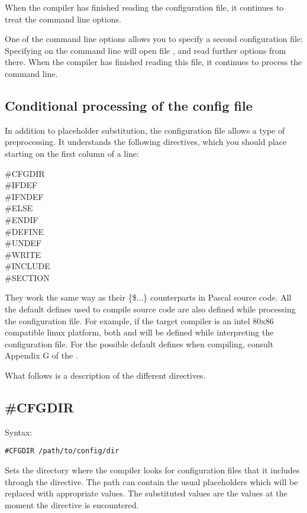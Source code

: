 When the compiler has finished reading the configuration file, it continues
to treat the command line options.

One of the command line options allows you to specify a second configuration
file: Specifying  on the command line will open file ,
and read further options from there. When the compiler has finished reading
this file, it continues to process the command line.

\subsection{Conditional processing of the config file}
In addition to placeholder substitution, the configuration file allows a type of preprocessing.
It understands the following directives, which you should place starting on the first column of a line:
\begin{description}
\item [\#CFGDIR]
\item [\#IFDEF]
\item [\#IFNDEF]
\item [\#ELSE]
\item [\#ENDIF]
\item [\#DEFINE]
\item [\#UNDEF]
\item [\#WRITE]
\item [\#INCLUDE]
\item [\#SECTION]
\end{description}
They work the same way as their \{\$...\}  counterparts in Pascal source code.
All the default defines used to compile source code are also defined while
processing the configuration file. For example, if the target compiler is an
intel 80x86 compatible linux platform, both  and  will be
defined while interpreting the configuration file. For the possible default
defines when compiling, consult Appendix G of the \progref.

What follows is a description of the different directives.

\subsection{\#CFGDIR}
Syntax:
\begin{verbatim}
#CFGDIR /path/to/config/dir
\end{verbatim}
Sets the directory where the compiler looks for configuration files that it
includes through the  directive.  The path can contain the
usual placeholders which will be replaced with appropriate values.
The substituted values are the values at the moment the  directive is
encountered.

